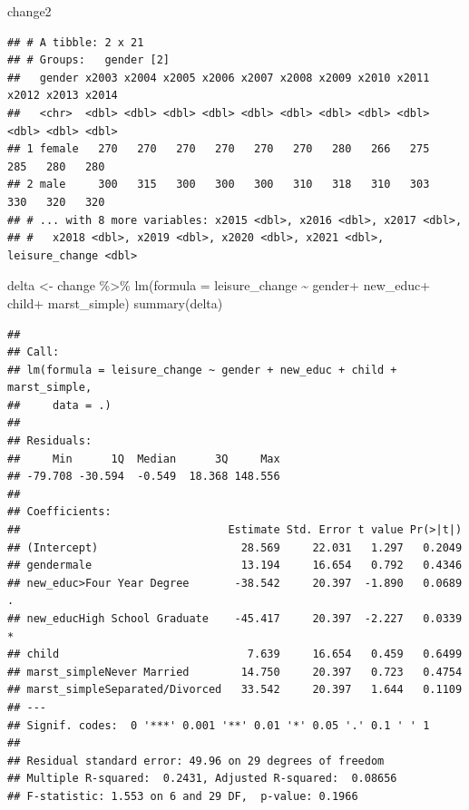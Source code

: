 \documentclass[
]{article}
\newenvironment{Shaded}{\begin{snugshade}}{\end{snugshade}}
\newcommand{\AttributeTok}[1]{\textcolor[rgb]{0.77,0.63,0.00}{#1}}
\newcommand{\FunctionTok}[1]{\textcolor[rgb]{0.00,0.00,0.00}{#1}}
\newcommand{\NormalTok}[1]{#1}
\newcommand{\OtherTok}[1]{\textcolor[rgb]{0.56,0.35,0.01}{#1}}
\newcommand{\SpecialCharTok}[1]{\textcolor[rgb]{0.00,0.00,0.00}{#1}}
\begin{document}
\begin{Shaded}
\begin{Highlighting}[]
\NormalTok{change2}
\end{Highlighting}
\end{Shaded}

\begin{verbatim}
## # A tibble: 2 x 21
## # Groups:   gender [2]
##   gender x2003 x2004 x2005 x2006 x2007 x2008 x2009 x2010 x2011 x2012 x2013 x2014
##   <chr>  <dbl> <dbl> <dbl> <dbl> <dbl> <dbl> <dbl> <dbl> <dbl> <dbl> <dbl> <dbl>
## 1 female   270   270   270   270   270   270   280   266   275   285   280   280
## 2 male     300   315   300   300   300   310   318   310   303   330   320   320
## # ... with 8 more variables: x2015 <dbl>, x2016 <dbl>, x2017 <dbl>,
## #   x2018 <dbl>, x2019 <dbl>, x2020 <dbl>, x2021 <dbl>, leisure_change <dbl>
\end{verbatim}

\begin{Shaded}
\begin{Highlighting}[]
\NormalTok{delta }\OtherTok{\textless{}{-}}\NormalTok{ change }\SpecialCharTok{\%\textgreater{}\%}
  \FunctionTok{lm}\NormalTok{(}\AttributeTok{formula =}\NormalTok{ leisure\_change }\SpecialCharTok{\textasciitilde{}}\NormalTok{ gender}\SpecialCharTok{+}\NormalTok{ new\_educ}\SpecialCharTok{+}\NormalTok{ child}\SpecialCharTok{+}\NormalTok{ marst\_simple)}
\FunctionTok{summary}\NormalTok{(delta)}
\end{Highlighting}
\end{Shaded}

\begin{verbatim}
## 
## Call:
## lm(formula = leisure_change ~ gender + new_educ + child + marst_simple, 
##     data = .)
## 
## Residuals:
##     Min      1Q  Median      3Q     Max 
## -79.708 -30.594  -0.549  18.368 148.556 
## 
## Coefficients:
##                                Estimate Std. Error t value Pr(>|t|)  
## (Intercept)                      28.569     22.031   1.297   0.2049  
## gendermale                       13.194     16.654   0.792   0.4346  
## new_educ>Four Year Degree       -38.542     20.397  -1.890   0.0689 .
## new_educHigh School Graduate    -45.417     20.397  -2.227   0.0339 *
## child                             7.639     16.654   0.459   0.6499  
## marst_simpleNever Married        14.750     20.397   0.723   0.4754  
## marst_simpleSeparated/Divorced   33.542     20.397   1.644   0.1109  
## ---
## Signif. codes:  0 '***' 0.001 '**' 0.01 '*' 0.05 '.' 0.1 ' ' 1
## 
## Residual standard error: 49.96 on 29 degrees of freedom
## Multiple R-squared:  0.2431, Adjusted R-squared:  0.08656 
## F-statistic: 1.553 on 6 and 29 DF,  p-value: 0.1966
\end{verbatim}
\end{document}
